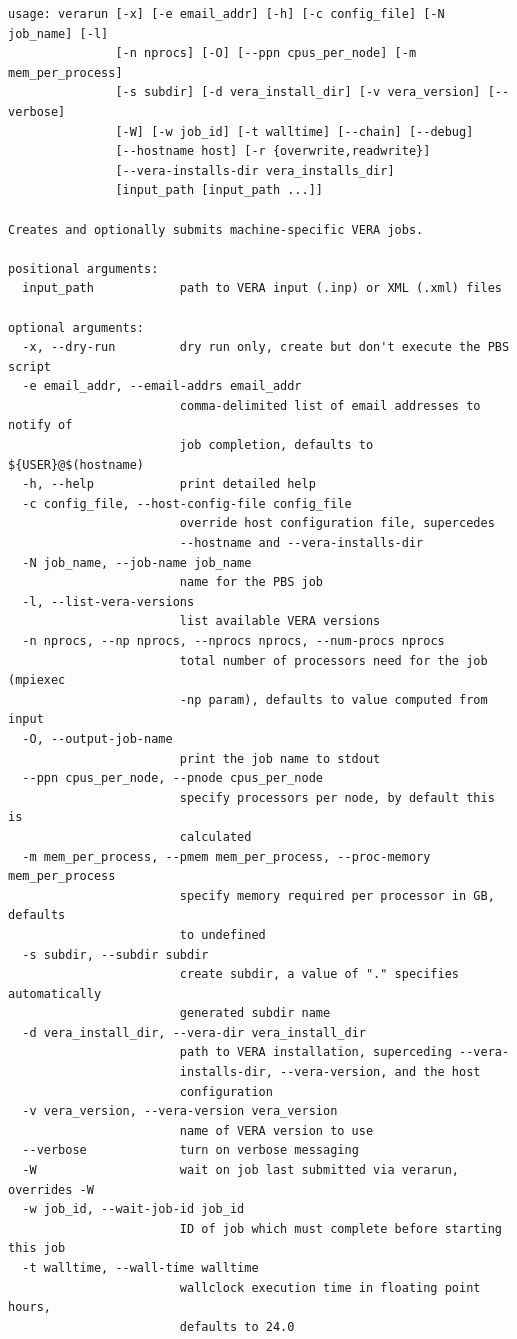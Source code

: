 \begin{Verbatim}[fontsize=\small]
usage: verarun [-x] [-e email_addr] [-h] [-c config_file] [-N job_name] [-l]
               [-n nprocs] [-O] [--ppn cpus_per_node] [-m mem_per_process]
               [-s subdir] [-d vera_install_dir] [-v vera_version] [--verbose]
               [-W] [-w job_id] [-t walltime] [--chain] [--debug]
               [--hostname host] [-r {overwrite,readwrite}]
               [--vera-installs-dir vera_installs_dir]
               [input_path [input_path ...]]

Creates and optionally submits machine-specific VERA jobs.

positional arguments:
  input_path            path to VERA input (.inp) or XML (.xml) files

optional arguments:
  -x, --dry-run         dry run only, create but don't execute the PBS script
  -e email_addr, --email-addrs email_addr
                        comma-delimited list of email addresses to notify of
                        job completion, defaults to ${USER}@$(hostname)
  -h, --help            print detailed help
  -c config_file, --host-config-file config_file
                        override host configuration file, supercedes
                        --hostname and --vera-installs-dir
  -N job_name, --job-name job_name
                        name for the PBS job
  -l, --list-vera-versions
                        list available VERA versions
  -n nprocs, --np nprocs, --nprocs nprocs, --num-procs nprocs
                        total number of processors need for the job (mpiexec
                        -np param), defaults to value computed from input
  -O, --output-job-name
                        print the job name to stdout
  --ppn cpus_per_node, --pnode cpus_per_node
                        specify processors per node, by default this is
                        calculated
  -m mem_per_process, --pmem mem_per_process, --proc-memory mem_per_process
                        specify memory required per processor in GB, defaults
                        to undefined
  -s subdir, --subdir subdir
                        create subdir, a value of "." specifies automatically
                        generated subdir name
  -d vera_install_dir, --vera-dir vera_install_dir
                        path to VERA installation, superceding --vera-
                        installs-dir, --vera-version, and the host
                        configuration
  -v vera_version, --vera-version vera_version
                        name of VERA version to use
  --verbose             turn on verbose messaging
  -W                    wait on job last submitted via verarun, overrides -W
  -w job_id, --wait-job-id job_id
                        ID of job which must complete before starting this job
  -t walltime, --wall-time walltime
                        wallclock execution time in floating point hours,
                        defaults to 24.0


\end{Verbatim}
